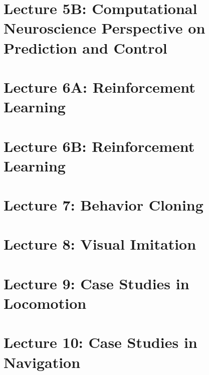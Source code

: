 \documentclass[a4paper]{article}
\begin{document}
\section{Lecture 5B: Computational Neuroscience Perspective on Prediction and Control}


\section{Lecture 6A: Reinforcement Learning}


\section{Lecture 6B: Reinforcement Learning}


\section{Lecture 7: Behavior Cloning}


\section{Lecture 8: Visual Imitation}


\section{Lecture 9: Case Studies in Locomotion}


\section{Lecture 10: Case Studies in Navigation}

\end{document}
